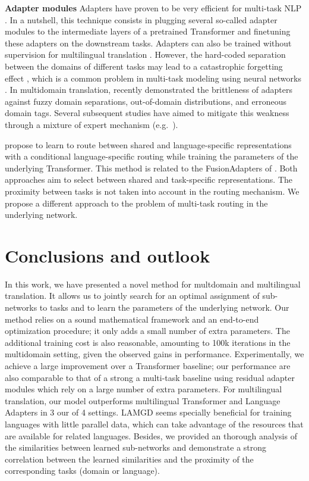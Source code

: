\documentclass[11pt]{article}
\newcommand{\fyDone}[1]{\done[FY]\Todo[FY:]{\textcolor{orange}{#1}}}
\begin{document}
\textbf{Adapter modules} Adapters have proven to be very efficient for multi-task NLP \citep{houlsby19parameter,Bapna19simple,Pham20Study,pfeiffer20adapterhub}. In a nutshell, this technique consists in plugging several so-called adapter modules to the intermediate layers of a pretrained Transformer and finetuning these adapters on the downstream tasks. Adapters can also be trained without supervision for multilingual translation \citep{Philip20monolingual}. However, the hard-coded separation between the domains of different tasks may lead to a catastrophic forgetting effect \citep{pfeiffer21adapterfusion}, which is a common problem in multi-task modeling using neural networks \citep{Michael89catastrophic}. In multidomain translation, \citet{Pham21revisiting} recently demonstrated the brittleness of adapters against fuzzy domain separations, out-of-domain distributions, and erroneous domain tags. Several subsequent studies have aimed to mitigate this weakness through a mixture of expert mechanism (e.g.\ \cite{pfeiffer21adapterfusion}).

\citet{biao21share} propose to learn to route between shared and language-specific representations with a conditional language-specific routing while training the parameters of the underlying Transformer. This method is related to the FusionAdapters of \citet{pfeiffer21adapterfusion}. Both approaches aim to select between shared and task-specific representations. The proximity between tasks is not taken into account in the routing mechanism. We propose a different approach to the problem of multi-task routing in the underlying network.

\section{Conclusions and outlook}\label{sec:conclusion}
In this work, we have presented a novel method for multdomain and multilingual translation. It allows us to jointly search for an optimal assignment of sub-networks to tasks and to learn the parameters of the underlying network. Our method relies on a sound mathematical framework and an end-to-end optimization procedure; it only adds a small number of extra parameters. The additional training cost is also reasonable, amounting to 100k iterations in the multidomain setting, given the observed gains in performance.\fyDone{There is a computational cost = 100k iterations} Experimentally, we achieve a large improvement over a Transformer baseline; our performance are also comparable to that of a strong a multi-task baseline using residual adapter modules which rely on a large number of extra parameters. For multilingual translation, our model outperforms multilingual Transformer and Language Adapters in 3 our of 4 settings. LAMGD seems specially beneficial for training languages with little parallel data, which can take advantage of the resources that are available for related languages. Besides, we provided an thorough analysis of the similarities between learned sub-networks and demonstrate a strong correlation between the learned similarities and the proximity of the corresponding tasks (domain or language).
\end{document}
